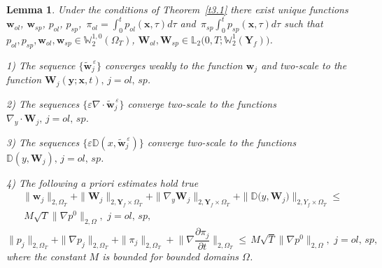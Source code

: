 \documentclass[10pt,a4paper]{amsart}
\newtheorem{lemma}{Lemma}
\begin{document}
\begin{lemma}\label{l5.2}
Under the conditions of Theorem~\ref{t3.1} there exist unique functions $\boldsymbol{w}_{ol}$, $\boldsymbol{w}_{sp}$, $p_{ol}$, $p_{sp}$, $\displaystyle\,{\pi}_{ol}=\int_{0}^{t}p_{ol}(\boldsymbol{x},\tau)d\tau$ and $\displaystyle\,{\pi}_{sp}\int_{0}^{t}p_{sp}(\boldsymbol{x},\tau)d\tau$ such that
$p_{ol}, p_{sp},\boldsymbol{w}_{ol}, \boldsymbol{w}_{sp}\in\mathbb{W}^{1,0}_{2}(\Omega_{T})$,
$\boldsymbol{W}_{ol}, \boldsymbol{W}_{sp}\in\mathbb{L}_{2}\big(0,T;\mathbb{W}^{1}_{2}(\textbf{Y}_{f})\big)$.

1) The sequence $\{\widetilde{\boldsymbol{w}}^{\,\varepsilon}_{j}\}$ converges weakly to the function $\boldsymbol{w}_{j}$ and two-scale to the function
$\boldsymbol{W}_{j}(\boldsymbol{y};\boldsymbol{x},t),\,j=ol,\,sp$.

2) The sequences $\{\varepsilon\nabla\cdot\widetilde{\boldsymbol{w}}^{\,\varepsilon}_{j}\}$ converge two-scale to the functions $\nabla_{y}\cdot\boldsymbol{W}_{j},\,j=ol,\,sp$.

3) The sequences $\{\varepsilon\mathbb{D}(x,\widetilde{\boldsymbol{w}}^{\,\varepsilon}_{j})\}$ converge two-scale to the functions $\mathbb{D}(y,\boldsymbol{W}_{j}),\,j=ol,\,sp$.

4) The following a priori estimates hold true
\begin{multline}\label{eq5.1}
\|{\boldsymbol{w}}_{j}\|_{2,\Omega_{T}}+\|\boldsymbol{W}_{j}\|_{2,\textbf{Y}_{f}\times\Omega_{T}}+
\|\nabla_{y}\boldsymbol{W}_{j}\|_{2,{\textbf{Y}}_{f}\times\Omega_{T}}+
\|\mathbb{D}\big(y,\boldsymbol{W}_{j})\|_{2,{Y}_{f}\times\Omega_{T}}\leqslant
\\
\,{M}\sqrt{T}\|\nabla{p}^{0}\|_{2,\Omega},\,\,j=ol,\,sp,
\end{multline}
\begin{equation}\label{eq5.2}
\|{p}_{j}\|_{2,\Omega_{T}}+\|\nabla{p}_{j}\|_{2,\Omega_{T}}+\|{\pi}_{j}\|_{2,\Omega_{T}}+
\Big\|\nabla\frac{\partial{\pi}_{j}}{\partial{t}}\Big\|_{2,\Omega_{T}}\leqslant\,
{M}\sqrt{T}\|\nabla{p}^{0}\|_{2,\Omega},\,\,j=ol,\,sp,
\end{equation}
where the constant $M$ is bounded for bounded domains $\Omega$.
\end{lemma}
\end{document}

